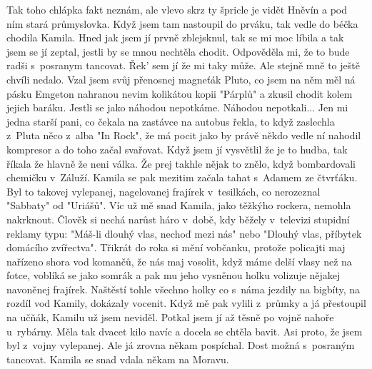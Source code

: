 
Tak toho chlápka fakt neznám, ale vlevo skrz ty špricle je vidět
Hněvín a pod ním stará průmyslovka. Když jsem tam nastoupil do prváku,
tak vedle do béčka chodila Kamila. Hned jak jsem jí prvně zblejsknul,
tak se mi moc líbila a tak jsem se jí zeptal, jestli by se mnou
nechtěla chodit. Odpověděla mi, že to bude radši s~posranym tancovat.
Řek' sem jí že mi taky může. Ale stejně mně to ještě chvíli nedalo.
Vzal jsem svůj přenosnej magneťák Pluto, co jsem na něm měl ná pásku
Emgeton nahranou nevim kolikátou kopii "Párplů" a zkusil chodit kolem
jejich baráku. Jestli se jako náhodou nepotkáme. Náhodou
nepotkali... Jen mi jedna starší pani, co čekala na zastávce na autobus
řekla, to když zaslechla z~Pluta něco z~alba "In Rock", že má pocit
jako by právě někdo vedle ní nahodil kompresor a do toho začal
svařovat. Když jsem jí vysvětlil že je to hudba, tak říkala že hlavně
že neni válka. Že prej takhle nějak to znělo, když bombardovali
chemičku v~Záluží. Kamila se pak mezitim začala tahat s~Adamem ze
čtvrťáku. Byl to takovej vylepanej, nagelovanej frajírek v~tesilkách,
co nerozeznal "Sabbaty" od "Uriášů". Víc už mě snad Kamila, jako
těžkýho rockera, nemohla nakrknout. Člověk si nechá narůst háro
v~době, kdy běžely v~televizi stupidní reklamy typu: "Máš-li dlouhý
vlas, nechoď mezi nás" nebo "Dlouhý vlas, příbytek domácího
zvířectva". Třikrát do roka si mění vobčanku, protože policajti maj
nařízeno shora vod komančů, že nás maj vosolit, když máme delší vlasy
než na fotce, voblíká se jako somrák a pak mu jeho vysněnou holku
volizuje nějakej navoněnej frajírek. Naštěstí tohle všechno holky co
s~náma jezdily na bigbíty, na rozdíl vod Kamily, dokázaly vocenit. Když
mě pak vylili z~průmky a já přestoupil na učňák, Kamilu už jsem
neviděl. Potkal jsem jí až těsně po vojně nahoře u~rybárny. Měla tak
dvacet kilo navíc a docela se chtěla bavit. Asi proto, že jsem byl
z~vojny vylepanej. Ale já zrovna někam pospíchal. Dost možná s~posraným
tancovat. Kamila se snad vdala někam na Moravu.


